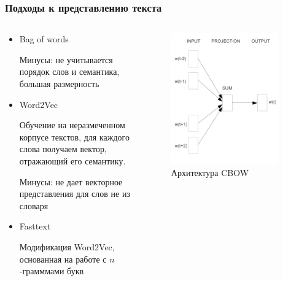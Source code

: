 \documentclass[10pt]{beamer}
\begin{document}
\begin{frame}
\frametitle{Подходы к представлению текста}

\begin{columns}
    \begin{column}{0.5\textwidth}
		\begin{itemize}
			\item
			Bag of words

			Минусы: не учитывается порядок слов и семантика, большая размерность

			\item
			Word2Vec
	
			Обучение на неразмеченном корпусе текстов, для каждого слова получаем вектор, отражающий его семантику.

			Минусы: не дает векторное представления для слов не из словаря

			\item
			Fasttext

			Модификация Word2Vec, основанная на работе с $n$-грамммами букв
		\end{itemize}
	\end{column}
    \begin{column}{0.5\textwidth}
        \begin{center}
        	\begin{figure}
	            \includegraphics[width=0.9\textwidth]{images/cbow.png} 
    	        \caption{Архитектура CBOW}
        	\end{figure}
        \end{center}
    \end{column}
\end{columns}

\end{frame}
\end{document}
